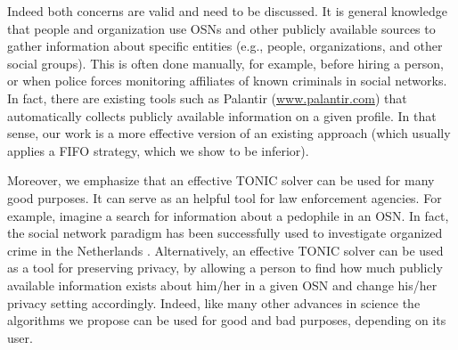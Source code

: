 \documentclass[journal]{IEEEtran}
\begin{document}
Indeed both concerns are valid and need to be discussed. It is general knowledge that people and organization use OSNs and other publicly available sources to gather information about specific entities (e.g., people, organizations, and other social groups). This is often done manually, for example, before hiring a person, 
or when police forces monitoring affiliates of known criminals in social networks. 
In fact, there are existing tools such as Palantir (\url{www.palantir.com}) that automatically collects publicly available information on a given profile. In that sense, our work is a more effective version of an existing approach (which usually applies a FIFO strategy, which we show to be inferior). 


Moreover, we emphasize that an effective TONIC solver can be used for many good purposes. It can serve as an helpful tool for law enforcement agencies. For example, imagine a search for information about a pedophile in an OSN. In fact, the social network paradigm has been successfully used to investigate organized crime in the Netherlands \cite{klerks2001network}. Alternatively, an effective TONIC solver can be used as a tool for preserving privacy, by allowing a person to find how much publicly available information exists about him/her in a given OSN and change his/her privacy setting accordingly. 
Indeed, like many other advances in science the algorithms we propose can be used for good and bad purposes, depending on its user. 








\ifCLASSOPTIONcaptionsoff
  \newpage
\fi




\end{document}
